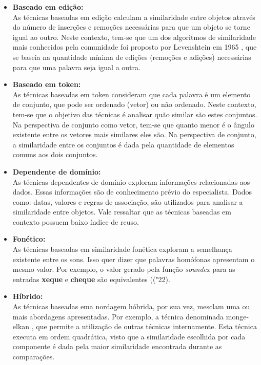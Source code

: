 \begin{itemize}
	\item \textbf{Baseado em edição:}\\
	As técnicas baseadas em edição calculam a similaridade entre objetos através do número de inserções e remoções necessárias para que um objeto se torne igual ao outro. Neste contexto, tem-se que  um dos algoritmos de similaridade mais conhecidos pela comunidade foi proposto por Levenshtein em 1965 \cite{levenshtein1966binary}, que se baseia na quantidade mínima de edições (remoções e adições) necessárias para que uma palavra seja igual a outra.
	
	\item \textbf{Baseado em token:}\\
	As técnicas baseadas em token consideram que cada palavra é um elemento de conjunto, que pode ser ordenado (vetor) ou não ordenado. Neste contexto, tem-se que o objetivo das técnicas é analisar quão similar são estes conjuntos. Na perspectiva de conjunto como vetor, tem-se que quanto menor é o ângulo existente entre os vetores mais similares eles são. Na perspectiva de conjunto, a similaridade entre os conjuntos é dada pela quantidade de elementos comuns aos dois conjuntos.
	
	\item \textbf{Dependente de domínio:}\\
	As técnicas dependentes de domínio exploram informações relacionadas aos dados. Essas informações são de conhecimento prévio do especialista. Dados como: datas, valores e regras de associação, são utilizados para analisar a similaridade entre objetos. Vale ressaltar que as técnicas baseadas em contexto possuem baixo índice de reuso.
	
	\item \textbf{Fonético:}\\
	As técnicas baseadas em similaridade fonética exploram a semelhança existente entre os sons. Isso quer dizer que palavras homófonas apresentam o mesmo valor. Por exemplo, o valor gerado pela função \textit{soundex} para as entradas \textbf{xeque} e \textbf{cheque} são equivalentes (("22).
	
	\item \textbf{Híbrido:}\\
	As técnicas baseadas ema nordagem hóbrida, por sua vez, mesclam uma ou mais abordagens apresentadas. Por exemplo, a técnica denominada monge-elkan \cite{monge1996field}, que permite a utilização de outras técnicas internamente. Esta técnica executa em ordem quadrática, visto que a similaridade escolhida por cada componente é dada pela maior similaridade encontrada durante as comparações.
\end{itemize}

